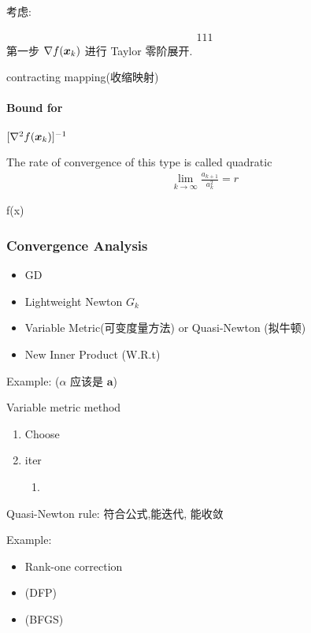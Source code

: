 考虑: 

\begin{align}
    111
\end{align}
第一步 $\nabla f(\bm{x}_k)$ 进行 Taylor 零阶展开. 

contracting mapping(收缩映射)

\paragraph{Bound for }$[\nabla^2 f(\bm{x}_k)]^{-1}$


The rate of convergence of this type is called quadratic
\begin{align*}
    \lim_{k\to\infty}\frac{a_{k+1}}{a_k^2}=r
\end{align*}

\begin{theorem}
    f(x)
\end{theorem}

\subsubsection{Convergence Analysis}
\begin{itemize}
    \item GD
    \item Lightweight Newton $G_k$
    \item Variable Metric(可变度量方法) or Quasi-Newton (拟牛顿)
    \item New Inner Product (W.R.t)
\end{itemize}

Example: ($\alpha$ 应该是 $\bm a$)

Variable metric method
\begin{enumerate}
    \item Choose
    \item iter
    \begin{enumerate}
        \item 
    \end{enumerate}
\end{enumerate}

Quasi-Newton rule: 符合公式,能迭代, 能收敛

Example:
\begin{itemize}
    \item Rank-one correction
    \item (DFP)
    \item (BFGS)
\end{itemize}

